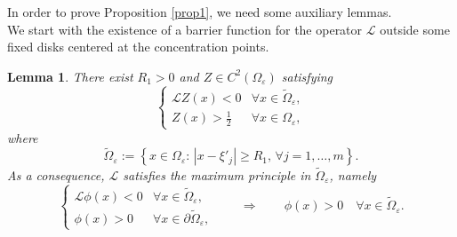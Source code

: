 \documentclass[11pt]{article}
\newtheorem{lemma}{Lemma}[section]
\begin{document}
In order to prove Proposition \ref{prop1}, we need some auxiliary lemmas.\\
We start with the existence of a barrier function for the operator $\mathcal L$ outside some fixed disks centered at the concentration points.

\begin{lemma}\label{le.maximum}
There exist $R_1>0$ and $Z\in C^2\left(\Omega_\varepsilon\right)$ satisfying
$$\left\{\begin{array}{ll}\mathcal LZ(x)<0&\forall x\in\widetilde\Omega_\varepsilon,\\Z(x)>\frac12&\forall x\in\Omega_\varepsilon,\end{array}\right.$$
where
$$\widetilde\Omega_\varepsilon:=\left\{x\in\Omega_\varepsilon:\,\left|x-\xi'_j\right|\ge R_1,\,\forall j=1,\dots,m\right\}.$$
As a consequence, $\mathcal L$ satisfies the maximum principle in $\widetilde\Omega_\varepsilon$, namely
$$\left\{\begin{array}{ll}\mathcal L\phi(x)<0&\forall x\in\widetilde\Omega_\varepsilon,\\\phi(x)>0&\forall x\in\partial\widetilde\Omega_\varepsilon,\end{array}\right.\qquad\Rightarrow\qquad\phi(x)>0\quad\forall x\in\widetilde\Omega_\varepsilon.$$
\end{lemma}
\end{document}
